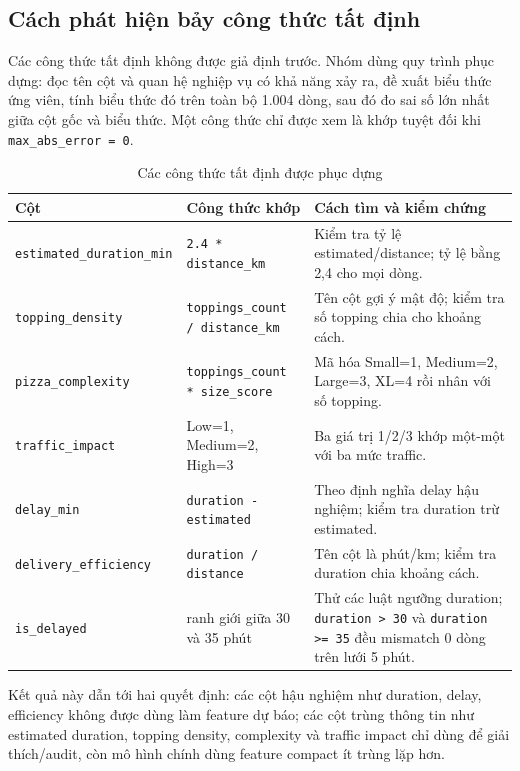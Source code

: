 \documentclass[12pt,a4paper,oneside]{report}
\newcommand{\code}[1]{\nolinkurl{#1}}
\begin{document}
\subsection{Cách phát hiện bảy công thức tất định}

Các công thức tất định không được giả định trước. Nhóm dùng quy trình phục dựng:
đọc tên cột và quan hệ nghiệp vụ có khả năng xảy ra, đề xuất biểu thức ứng
viên, tính biểu thức đó trên toàn bộ 1.004 dòng, sau đó đo sai số lớn nhất
giữa cột gốc và biểu thức. Một công thức chỉ được xem là khớp tuyệt đối khi
\code{max\_abs\_error = 0}.

\begin{table}[H]
\centering
\small
\caption{Các công thức tất định được phục dựng}
\begin{tabularx}{\textwidth}{p{3.2cm}p{4.2cm}X}
\toprule
Cột & Công thức khớp & Cách tìm và kiểm chứng\\
\midrule
\code{estimated\_duration\_min} & \code{2.4 * distance\_km} &
Kiểm tra tỷ lệ estimated/distance; tỷ lệ bằng 2,4 cho mọi dòng.\\
\code{topping\_density} & \code{toppings\_count / distance\_km} &
Tên cột gợi ý mật độ; kiểm tra số topping chia cho khoảng cách.\\
\code{pizza\_complexity} & \code{toppings\_count * size\_score} &
Mã hóa Small=1, Medium=2, Large=3, XL=4 rồi nhân với số topping.\\
\code{traffic\_impact} & Low=1, Medium=2, High=3 &
Ba giá trị 1/2/3 khớp một-một với ba mức traffic.\\
\code{delay\_min} & \code{duration - estimated} &
Theo định nghĩa delay hậu nghiệm; kiểm tra duration trừ estimated.\\
\code{delivery\_efficiency} & \code{duration / distance} &
Tên cột là phút/km; kiểm tra duration chia khoảng cách.\\
\code{is\_delayed} & ranh giới giữa 30 và 35 phút &
Thử các luật ngưỡng duration; \code{duration > 30} và
\code{duration >= 35} đều mismatch 0 dòng trên lưới 5 phút.\\
\bottomrule
\end{tabularx}
\end{table}

Kết quả này dẫn tới hai quyết định: các cột hậu nghiệm như duration, delay,
efficiency không được dùng làm feature dự báo; các cột trùng thông tin như
estimated duration, topping density, complexity và traffic impact chỉ dùng để
giải thích/audit, còn mô hình chính dùng feature compact ít trùng lặp hơn.
\end{document}
